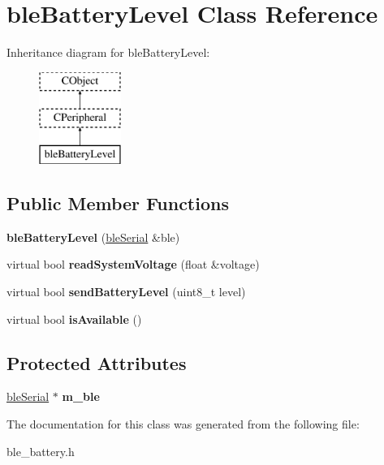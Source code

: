 \hypertarget{classble_battery_level}{\section{ble\-Battery\-Level Class Reference}
\label{classble_battery_level}
}
Inheritance diagram for ble\-Battery\-Level\-:\begin{figure}[H]
\begin{center}
\leavevmode
\includegraphics[height=3.000000cm]{classble_battery_level}
\end{center}
\end{figure}
\subsection*{Public Member Functions}
\begin{DoxyCompactItemize}
\item 
\hypertarget{classble_battery_level_a212d349975b73b6f6020ce496ed68834}{{\bfseries ble\-Battery\-Level} (\hyperlink{classble_serial}{ble\-Serial} \&ble)}\label{classble_battery_level_a212d349975b73b6f6020ce496ed68834}

\item 
\hypertarget{classble_battery_level_a2c6fae51a8653f720eb50169b094f7a5}{virtual bool {\bfseries read\-System\-Voltage} (float \&voltage)}\label{classble_battery_level_a2c6fae51a8653f720eb50169b094f7a5}

\item 
\hypertarget{classble_battery_level_ad770083f87f2f193b897ca767593e716}{virtual bool {\bfseries send\-Battery\-Level} (uint8\-\_\-t level)}\label{classble_battery_level_ad770083f87f2f193b897ca767593e716}

\item 
\hypertarget{classble_battery_level_a8cfd4674c5b405183b6b282e663849e4}{virtual bool {\bfseries is\-Available} ()}\label{classble_battery_level_a8cfd4674c5b405183b6b282e663849e4}

\end{DoxyCompactItemize}
\subsection*{Protected Attributes}
\begin{DoxyCompactItemize}
\item 
\hypertarget{classble_battery_level_ac1466f5cc1995a2af27914beb432dedb}{\hyperlink{classble_serial}{ble\-Serial} $\ast$ {\bfseries m\-\_\-ble}}\label{classble_battery_level_ac1466f5cc1995a2af27914beb432dedb}

\end{DoxyCompactItemize}


The documentation for this class was generated from the following file\-:\begin{DoxyCompactItemize}
\item 
ble\-\_\-battery.\-h\end{DoxyCompactItemize}
